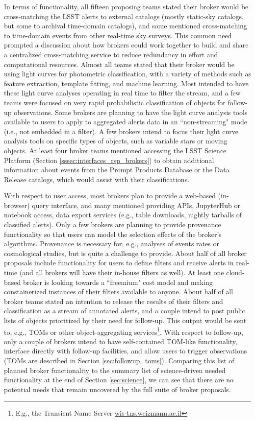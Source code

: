 In terms of functionality, all fifteen proposing teams stated their broker would be cross-matching the  {LSST} alerts to external catalogs (mostly static-sky catalogs, but some to archival time-domain catalogs), and some mentioned cross-matching to time-domain events from other real-time sky surveys.
This common need prompted a discussion about how brokers could work together to build and share a centralized cross-matching service to reduce redundancy in effort and computational resources.
Almost all teams stated that their broker would be using light curves for photometric classification, with a variety of methods such as feature extraction, template fitting, and machine learning.
Most intended to have these light curve analyses operating in real time to filter the stream, and a few teams were focused on very rapid probabilistic classification of objects for follow-up observations. 
Some brokers are planning to have the light curve analysis tools available to users to apply to aggregated alerts data in an ``non-streaming" mode (i.e., not embedded in a filter). 
A few brokers intend to focus their light curve analysis tools on specific types of objects, such as variable stars or moving objects.
At least four broker teams mentioned accessing the  {LSST}  {Science Platform} (Section \ref{sssec:interfaces_rsp_brokers}) to obtain additional information about events from the Prompt Products Database or the  {Data Release} catalogs, which would assist with their classifications.

With respect to user access, most brokers plan to provide a web-based (in-browser) query interface, and many mentioned providing APIs, JupyterHub or notebook access, data export services (e.g., table downloads, nightly tarballs of classified alerts).
Only a few brokers are planning to provide  {provenance} functionality so that users can model the selection effects of the broker's algorithms.
Provenance is necessary for, e.g., analyses of events rates or cosmological studies, but is quite a challenge to provide.
About half of all broker proposals include functionality for users to define filters and receive alerts in real-time (and all brokers will have their in-house filters as well).
At least one cloud-based broker is looking towards a ``freemium" cost model and making constainerized instances of their filters available to anyone. 
About half of all broker teams stated an intention to release the results of their filters and classification as a stream of annotated alerts, and a couple intend to post public lists of objects prioritized by their need for follow-up.
This output would be sent to, e.g., TOMs or other object-aggregating services\footnote{E.g., the Transient Name Server \url{wis-tns.weizmann.ac.il}}.
With respect to follow-up, only a couple of brokers intend to have self-contained  {TOM}-like functionality, interface directly with follow-up facilities, and allow users to trigger observations (TOMs are described in Section \ref{sec:followup_toms}).
Comparing this list of planned broker functionality to the summary list of science-driven needed functionality at the end of Section \ref{sec:science}, we can see that there are no potential needs that remain uncovered by the full suite of broker proposals.

